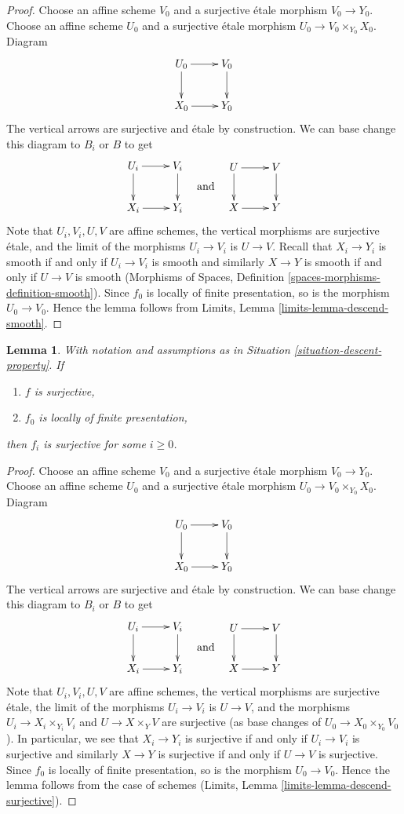 \documentclass{stacks-project}
\theoremstyle{plain}
\newtheorem{lemma}[subsection]{Lemma}
\theoremstyle{definition}
\theoremstyle{remark}
\numberwithin{equation}{subsection}
\begin{document}
\begin{proof}
Choose an affine scheme $V_0$ and a surjective \'etale morphism
$V_0 \to Y_0$. Choose an affine scheme $U_0$ and a surjective \'etale
morphism $U_0 \to V_0 \times_{Y_0} X_0$. Diagram
$$
\xymatrix{
U_0 \ar[d] \ar[r] & V_0 \ar[d] \\
X_0 \ar[r] & Y_0
}
$$
The vertical arrows are surjective and \'etale by construction.
We can base change this diagram to $B_i$ or $B$ to get
$$
\vcenter{
\xymatrix{
U_i \ar[d] \ar[r] & V_i \ar[d] \\
X_i \ar[r] & Y_i
}
}
\quad\text{and}\quad
\vcenter{
\xymatrix{
U \ar[d] \ar[r] & V \ar[d] \\
X \ar[r] & Y
}
}
$$
Note that $U_i, V_i, U, V$ are affine schemes,
the vertical morphisms are surjective \'etale, and the limit of the
morphisms $U_i \to V_i$ is $U \to V$. Recall that $X_i \to Y_i$ is smooth
if and only if $U_i \to V_i$ is smooth and similarly
$X \to Y$ is smooth if and only if $U \to V$ is smooth
(Morphisms of Spaces, Definition \ref{spaces-morphisms-definition-smooth}).
Since $f_0$ is locally of finite
presentation, so is the morphism $U_0 \to V_0$. Hence the lemma follows
from Limits, Lemma \ref{limits-lemma-descend-smooth}.
\end{proof}

\begin{lemma}
\label{lemma-descend-surjective}
With notation and assumptions as in
Situation \ref{situation-descent-property}. If
\begin{enumerate}
\item $f$ is surjective,
\item $f_0$ is locally of finite presentation,
\end{enumerate}
then $f_i$ is surjective for some $i \geq 0$.
\end{lemma}

\begin{proof}
Choose an affine scheme $V_0$ and a surjective \'etale morphism
$V_0 \to Y_0$. Choose an affine scheme $U_0$ and a surjective \'etale
morphism $U_0 \to V_0 \times_{Y_0} X_0$. Diagram
$$
\xymatrix{
U_0 \ar[d] \ar[r] & V_0 \ar[d] \\
X_0 \ar[r] & Y_0
}
$$
The vertical arrows are surjective and \'etale by construction.
We can base change this diagram to $B_i$ or $B$ to get
$$
\vcenter{
\xymatrix{
U_i \ar[d] \ar[r] & V_i \ar[d] \\
X_i \ar[r] & Y_i
}
}
\quad\text{and}\quad
\vcenter{
\xymatrix{
U \ar[d] \ar[r] & V \ar[d] \\
X \ar[r] & Y
}
}
$$
Note that $U_i, V_i, U, V$ are affine schemes, the vertical morphisms are
surjective \'etale, the limit of the morphisms $U_i \to V_i$ is $U \to V$,
and the morphisms $U_i \to X_i \times_{Y_i} V_i$ and
$U \to X \times_Y V$ are surjective (as base changes of
$U_0 \to X_0 \times_{Y_0} V_0$). In particular, we see that
$X_i \to Y_i$ is surjective if and only if $U_i \to V_i$ is surjective
and similarly $X \to Y$ is surjective if and only if $U \to V$ is surjective.
Since $f_0$ is locally of finite
presentation, so is the morphism $U_0 \to V_0$. Hence the lemma follows
from the case of schemes (Limits, Lemma \ref{limits-lemma-descend-surjective}).
\end{proof}
\end{document}
